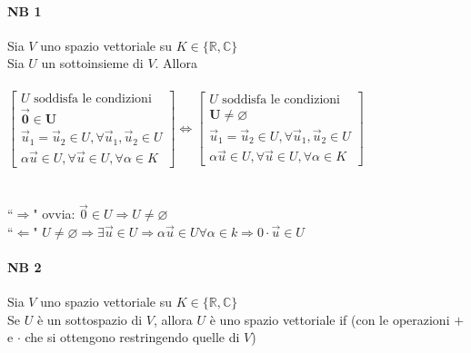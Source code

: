 \paragraph{NB 1} Sia $V$ uno spazio vettoriale su $K \in \{\mathbb{R}, \mathbb{C}\}$ \\
Sia $U$ un sottoinsieme di $V$. Allora\\\\

$\begin{bmatrix}
    U \textrm{ soddisfa le condizioni}\\
    \pmb{\vec{0}\in U}\\
    \vec{u}_1=\vec{u}_2\in U, \forall \vec{u}_1, \vec{u}_2\in U\\
    \alpha \vec{u}\in U, \forall \vec{u}\in U, \forall \alpha \in K
\end{bmatrix}
\Longleftrightarrow
\begin{bmatrix}
    U \textrm{ soddisfa le condizioni}\\
    \pmb{U \neq \varnothing}\\
    \vec{u}_1=\vec{u}_2\in U, \forall \vec{u}_1, \vec{u}_2\in U\\
    \alpha \vec{u}\in U, \forall \vec{u}\in U, \forall \alpha \in K
\end{bmatrix}$\\\\\\
``$\Longrightarrow$" ovvia: $\vec{0}\in U\Longrightarrow U\neq \varnothing$\\
``$\Longleftarrow$" $U \neq \varnothing \Rightarrow \exists \vec{u}\in U 
\Rightarrow \alpha\vec{u}\in U \forall \alpha \in k \Rightarrow 0\cdot \vec{u}\in U$

\paragraph{NB 2} {\color{red}
    Sia $V$ uno spazio vettoriale su $K \in\{\mathbb{R}, \mathbb{C}\}$\\
    Se $U$ è un sottospazio di $V$, allora $U$ è uno spazio vettoriale if 
    (con le operazioni $+$ e $\cdot$ che si ottengono restringendo quelle di $V$)
}

